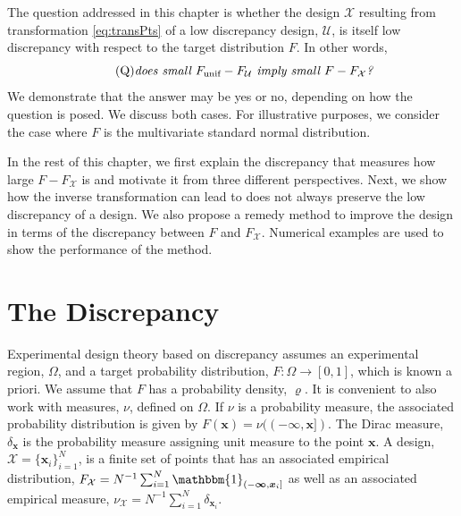 \documentclass[graybox]{svmult}
\newcommand{\vx}{\boldsymbol{x}}
\newcommand{\vinfty}{\boldsymbol{\infty}}
\newcommand{\Udes}{\mathcal{U}}
\newcommand{\Xdes}{\mathcal{X}}
\newcommand{\Ftar}{F}
\newcommand{\ftar}{\varrho}
\newcommand{\bbone}{\mathbbm{1}}
\newcommand{\unif}{\textup{unif}}
\begin{document}
The question addressed in this chapter is whether the design $\Xdes$ resulting from transformation \eqref{eq:transPts} of a low discrepancy design, $\Udes$, is itself low discrepancy with respect to the target distribution $\Ftar$. 
In other words, 
\begin{equation} \label{BigQ} \tag{Q}
\text{\emph{does small $F_\unif - F_\Udes$ imply small $\Ftar - F_\Xdes$?}}
\end{equation}
We demonstrate that the answer may be yes or no, depending on how the question is posed.  
We discuss both cases.  
For illustrative purposes, we consider the case where $\Ftar$ is the multivariate standard normal distribution.

In the rest of this chapter, we first explain the discrepancy that measures how large $\Ftar - F_\Xdes$ is and motivate it from three different perspectives.  Next, we show how the inverse transformation can lead to does not always preserve the low discrepancy of a design.
We also propose a remedy method to improve the design in terms of the discrepancy between $\Ftar$ and $F_\Xdes$. 
Numerical examples are used to show the performance of the method. 

\section{The Discrepancy}

Experimental design theory based on  discrepancy assumes an experimental region, $\Omega$, and a target probability distribution, $\Ftar:\Omega \to [0,1]$, which is known a priori. We assume that $\Ftar$ has a probability density, $\ftar$.  It is convenient to also work with measures, $\nu$, defined on $\Omega$.  If $\nu$ is a probability measure, the associated probability distribution is given by $F(\vx) = \nu((-\vinfty,\vx])$.  The Dirac measure, $\delta_{\vx}$ is the probability measure assigning unit measure to the point $\vx$.  A design, $\Xdes = \{\vx_i\}_{i=1}^N$, is a finite set of points that has an associated empirical distribution, $F_{\Xdes}  = N^{-1} \sum_{i=1}^N \bbone_{(-\vinfty,\vx_i]}$ as well as an associated empirical measure, $\nu_{\Xdes}  = N^{-1} \sum_{i=1}^N \delta_{\vx_i}$.
\end{document}
